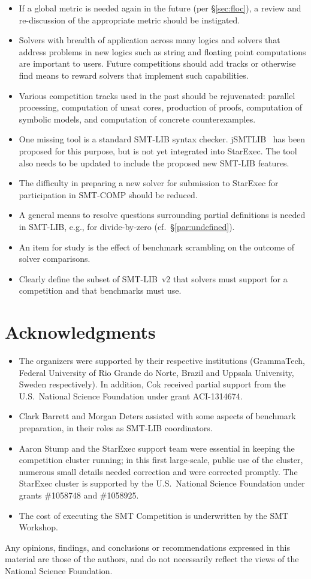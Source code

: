\documentclass[twoside,11pt]{article}
\begin{document}
\begin{itemize}
\item If a global metric is needed again in the future (per \S\ref{sec:floc}), a review and re-discussion of the appropriate metric should be instigated.
\item Solvers with breadth of application across many logics and solvers that address problems in new logics such as string and floating point computations are important to users. Future competitions should add tracks or otherwise find means to reward solvers that implement such capabilities.
\item Various competition tracks used in the past should be rejuvenated: parallel processing, computation of unsat cores, production of proofs, computation of symbolic models, and computation of concrete counterexamples.
\item One missing tool is a standard SMT-LIB syntax checker. jSMTLIB~\cite{cok2011jsmtlib} has been proposed for this purpose, but is not yet integrated into StarExec. The tool also needs to be updated to include the proposed new SMT-LIB features.
\item The difficulty in preparing a new solver for submission to StarExec for participation in SMT-COMP should be reduced.
\item A general means to resolve questions surrounding partial definitions is needed in SMT-LIB, e.g., for divide-by-zero  (cf.~\S\ref{par:undefined}).
\item An item for study is the effect of benchmark scrambling on the outcome of solver comparisons.
\item Clearly define the subset of SMT-LIB~v2 that solvers must support for a competition and that benchmarks must use.
\end{itemize}

\section*{Acknowledgments}

\begin{itemize}
\item The organizers were supported by their respective institutions (GrammaTech, Federal University of Rio Grande do Norte, Brazil and Uppsala University, Sweden respectively).  In addition, Cok received partial support from the U.S.\ National Science Foundation under grant ACI-1314674.

\item Clark Barrett and Morgan Deters assisted with some aspects of benchmark preparation, in their roles as SMT-LIB coordinators.

\item Aaron Stump and the StarExec support team were essential in keeping the competition cluster running; in this first large-scale, public use of the cluster, numerous small details needed correction and were corrected promptly.  The StarExec cluster is supported by the U.S.\ National Science Foundation under grants \#1058748 and \#1058925.
  
\item The cost of executing the SMT Competition is underwritten by the SMT Workshop.
\end{itemize}

Any opinions, findings, and conclusions or recommendations expressed in this material are those of the authors, and do not necessarily reflect the views of the National Science Foundation.



\end{document}
